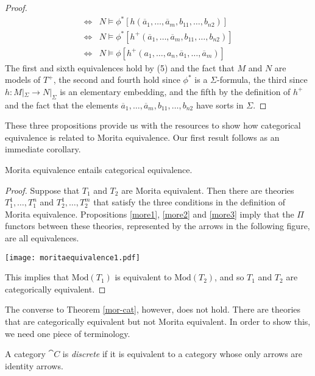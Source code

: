 \begin{proof}
\begin{align*}
\Longleftrightarrow& N\vDash\phi^*[h(\overline{a}_1,\ldots, \overline{a}_m, b_{11},\ldots, b_{n2})]\\
\Longleftrightarrow& N\vDash\phi^*[h^+(\overline{a}_1,\ldots, \overline{a}_m, b_{11},\ldots, b_{n2})]\\
\Longleftrightarrow& N\vDash\phi[h^+(a_1,\ldots, a_n, \overline{a}_1,\ldots, \overline{a}_m)]
\end{align*}
The first and sixth equivalences hold by (5) and the fact that $M$ and
$N$ are models of $T^+$, the second and fourth hold since $\phi^*$ is
a $\Sigma$-formula, the third since $h:M|_\Sigma\rightarrow N|_\Sigma$
is an elementary embedding, and the fifth by the definition of $h^+$
and the fact that the elements
$\overline{a}_1,\ldots, \overline{a}_m, b_{11}, \ldots, b_{n2}$ have
sorts in $\Sigma$.
\end{proof}

These three propositions provide us with the resources to show how
categorical equivalence is related to Morita equivalence. Our first
result follows as an immediate corollary.

\begin{thm}[Barrett] Morita equivalence entails categorical
  equivalence. \label{mor-cat} \end{thm}

\begin{proof} Suppose that $T_1$ and $T_2$ are Morita equivalent. Then
  there are theories $T_1^1, \ldots, T_1^n$ and $T_2^1,\ldots, T_2^m$
  that satisfy the three conditions in the definition of Morita
  equivalence.  Propositions \ref{more1}, \ref{more2} and \ref{more3}
  imply that the $\Pi$ functors between these theories, represented by
  the arrows in the following figure, are all equivalences.
\begin{center}
\texttt{[image: moritaequivalence1.pdf]}
\end{center}
This implies that $\text{Mod}(T_1)$ is equivalent to
$\text{Mod}(T_2)$, and so $T_1$ and $T_2$ are categorically
equivalent.
\end{proof}

The converse to Theorem \ref{mor-cat}, however, does not hold.  There
are theories that are categorically equivalent but not Morita
equivalent.  In order to show this, we
need one piece of terminology.

\begin{defn} A category $\cat{C}$ is \emph{discrete} if it is
  equivalent to a category whose only arrows are identity
  arrows. \end{defn}

